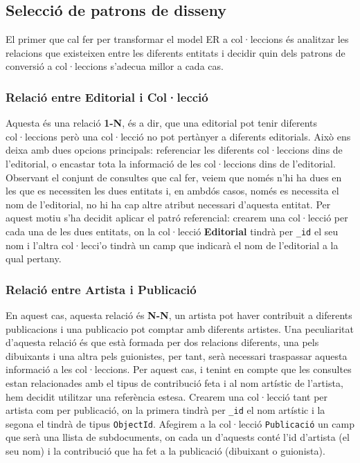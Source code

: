 \documentclass{article}
\begin{document}
\subsection{Selecci\'o de patrons de disseny}
El primer que cal fer per transformar el model ER a col·leccions \'es analitzar les relacions que existeixen entre les diferents entitats i decidir quin dels patrons de conversi\'o a col·leccions s'adecua millor a cada cas.

\subsubsection*{Relaci\'o entre \textbf{Editorial} i \textbf{Col·lecci\'o}}
Aquesta \'es una relaci\'o \textbf{1-N}, \'es a dir, que una editorial pot tenir diferents col·leccions per\`o una col·lecci\'o no pot pert\`anyer a diferents editorials. Aix\`o ens deixa amb dues opcions principals: referenciar les diferents col·leccions dins de l'editorial, o encastar tota la informaci\'o de les col·leccions dins de l'editorial. Observant el conjunt de consultes que cal fer, veiem que nom\'es n'hi ha dues en les que es necessiten les dues entitats i, en ambd\'os casos, nom\'es es necessita el nom de l'editorial, no hi ha cap altre atribut necessari d'aquesta entitat. Per aquest motiu s'ha decidit aplicar el patr\'o referencial: crearem una col·lecci\'o per cada una de les dues entitats, on la col·lecci\'o \textbf{Editorial} tindr\`a per \texttt{\_id} el seu nom i l'altra col·lecci'o tindr\`a un camp que indicar\`a el nom de l'editorial a la qual pertany.

\subsubsection*{Relaci\'o entre \textbf{Artista} i \textbf{Publicaci\'o}}
En aquest cas, aquesta relaci\'o \'es \textbf{N-N}, un artista pot haver contribuit a diferents publicacions i una publicacio pot comptar amb diferents artistes. Una peculiaritat d'aquesta relaci\'o \'es que est\`a formada per dos relacions diferents, una pels dibuixants i una altra pels guionistes, per tant, ser\`a necessari traspassar aquesta informaci\'o a les col·leccions. Per aquest cas, i tenint en compte que les consultes estan relacionades amb el tipus de contribuci\'o feta i al nom art\'istic de l'artista, hem decidit utilitzar una refer\`encia estesa. Crearem una col·lecci\'o tant per artista com per publicaci\'o, on la primera tindr\`a per \texttt{\_id} el nom art\'istic i la segona el tindr\`a de tipus \texttt{ObjectId}. Afegirem a la col·lecci\'o \texttt{Publicaci\'o} un camp que ser\`a una llista de subdocuments, on cada un d'aquests cont\'e l'id d'artista (el seu nom) i la contribuci\'o que ha fet a la publicaci\'o (dibuixant o guionista).
\end{document}
